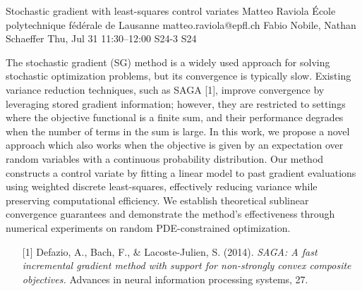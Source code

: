 \begin{talk}
  {Stochastic gradient with least-squares control variates}%
  {Matteo Raviola}%
  {École polytechnique fédérale de Lausanne}%
  {matteo.raviola@epfl.ch}%
  {Fabio Nobile, Nathan Schaeffer}%
  {}%
  {Thu, Jul 31 11:30–12:00}%
  {S24-3}%
  {S24}%
  
  
  
  The stochastic gradient (SG) method is a widely used approach for solving stochastic optimization problems, but its convergence is typically slow.
  Existing variance reduction techniques, such as SAGA [1], improve convergence by leveraging stored gradient information; however, they are restricted to settings where the objective functional is a finite sum, and their performance degrades when the number of terms in the sum is large.
  In this work, we propose a novel approach which also works when the objective is given by an expectation over random variables with a continuous probability distribution.
  Our method constructs a control variate by fitting a linear model to past gradient evaluations using weighted discrete least-squares, effectively reducing variance while preserving computational efficiency.
  We establish theoretical sublinear convergence guarantees and demonstrate the method's effectiveness through numerical experiments on random PDE-constrained optimization.
  
  \medskip
  
  \begin{enumerate}
    \item[{[1]}] Defazio, A., Bach, F., \& Lacoste-Julien, S. (2014). {\it SAGA: A fast incremental gradient method with support for non-strongly convex composite objectives.} Advances in neural information processing systems, 27.
  \end{enumerate}
  
\end{talk}


